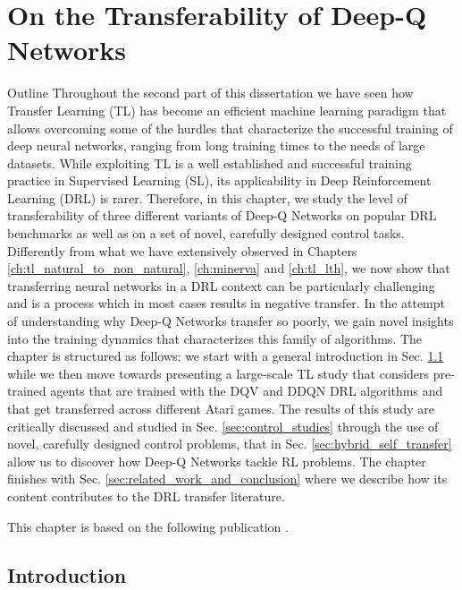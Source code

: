 
\chapter{On the Transferability of Deep-Q Networks} %
\label{ch:dqn_transfer} %

\begin{remark}{Outline}
	Throughout the second part of this dissertation we have seen how Transfer Learning (TL) has become an efficient machine learning paradigm that allows overcoming some of the hurdles that characterize the successful training of deep neural networks, ranging from long training times to the needs of large datasets. While exploiting TL is a well established and successful training practice in Supervised Learning (SL), its applicability in Deep Reinforcement Learning (DRL) is rarer. Therefore, in this chapter, we study the level of transferability of three different variants of Deep-Q Networks on popular DRL benchmarks as well as on a set of novel, carefully designed control tasks. Differently from what we have extensively observed in Chapters \ref{ch:tl_natural_to_non_natural}, \ref{ch:minerva} and \ref{ch:tl_lth}, we now show that transferring neural networks in a DRL context can be particularly challenging and is a process which in most cases results in negative transfer. In the attempt of understanding why Deep-Q Networks transfer so poorly, we gain novel insights into the training dynamics that characterizes this family of algorithms. The chapter is structured as follows: we start with a general introduction in Sec. \ref{sec:intro} while we then move towards presenting a large-scale TL study that considers pre-trained agents that are trained with the DQV and DDQN DRL algorithms and that get transferred across different Atari games. The results of this study are critically discussed and studied in Sec. \ref{sec:control_studies} through the use of novel, carefully designed control problems, that in Sec. \ref{sec:hybrid_self_transfer} allow us to discover how Deep-Q Networks tackle RL problems. The chapter finishes with Sec. \ref{sec:related_work_and_conclusion} where we describe how its content contributes to the DRL transfer literature.

	This chapter is based on the following publication \cite{}.

\end{remark}


\section{Introduction}
\label{sec:intro}

